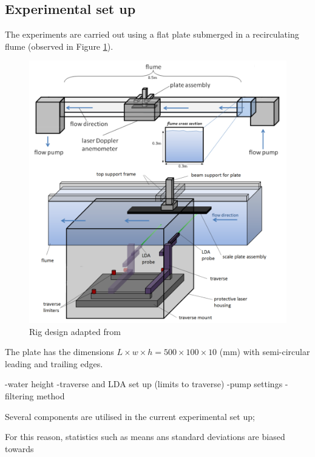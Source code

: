\documentclass[12pt,oneside,a4paper]{article}
\begin{document}
\subsection{Experimental set up}
The experiments are carried out using a flat plate submerged in a recirculating flume (observed in Figure \ref{figure:experiments:setUp}).
%
\begin{figure}[!b]
\centering
\includegraphics[width = 12cm]{images/LDA_theoryImages/expSetUp.png}
\caption{Rig design adapted from \cite{fletcher2014phd}}
\label{figure:experiments:setUp}
\end{figure}
%
The plate has the dimensions $L \times w \times h = 500 \times 100 \times 10 $ (mm) with semi-circular leading and trailing edges.


\vspace{5cm}
-water height 
-traverse and LDA set up (limits to traverse)
-pump settings
-filtering method
\vspace{2cm}



Several components are utilised in the current experimental set up; 





 For this reason, statistics such as means ans standard deviations are biased towards  
\\\\\\
 
\end{document}
